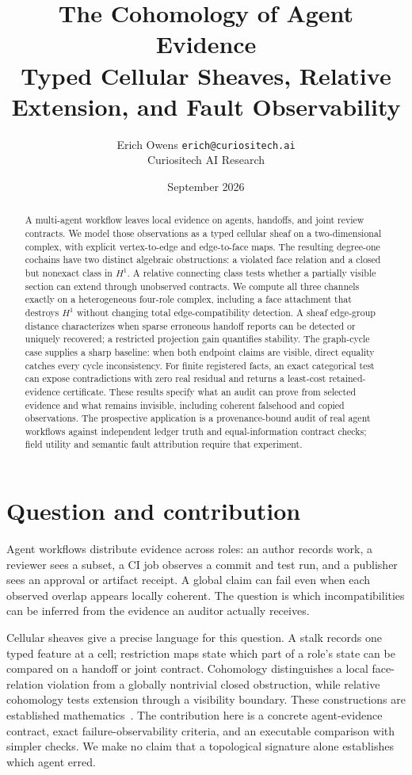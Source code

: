 \documentclass[11pt,a4paper]{article}
\title{\textbf{The Cohomology of Agent Evidence}\\[4pt]
\large Typed Cellular Sheaves, Relative Extension, and Fault Observability}
\author{Erich Owens \quad \texttt{erich@curiositech.ai}\\
\normalsize Curiositech AI Research}
\date{September 2026}
\begin{document}
\maketitle

\begin{abstract}
A multi-agent workflow leaves local evidence on agents, handoffs, and joint review contracts. We model those observations as a typed cellular sheaf on a two-dimensional complex, with explicit vertex-to-edge and edge-to-face maps. The resulting degree-one cochains have two distinct algebraic obstructions: a violated face relation and a closed but nonexact class in $H^1$. A relative connecting class tests whether a partially visible section can extend through unobserved contracts. We compute all three channels exactly on a heterogeneous four-role complex, including a face attachment that destroys $H^1$ without changing total edge-compatibility detection. A sheaf edge-group distance characterizes when sparse erroneous handoff reports can be detected or uniquely recovered; a restricted projection gain quantifies stability. The graph-cycle case supplies a sharp baseline: when both endpoint claims are visible, direct equality catches every cycle inconsistency. For finite registered facts, an exact categorical test can expose contradictions with zero real residual and returns a least-cost retained-evidence certificate. These results specify what an audit can prove from selected evidence and what remains invisible, including coherent falsehood and copied observations. The prospective application is a provenance-bound audit of real agent workflows against independent ledger truth and equal-information contract checks; field utility and semantic fault attribution require that experiment.
\end{abstract}

\section{Question and contribution}\label{sec:intro}
Agent workflows distribute evidence across roles: an author records work, a reviewer sees a subset, a CI job observes a commit and test run, and a publisher sees an approval or artifact receipt. A global claim can fail even when each observed overlap appears locally coherent. The question is which incompatibilities can be inferred from the evidence an auditor actually receives.

Cellular sheaves give a precise language for this question. A stalk records one typed feature at a cell; restriction maps state which part of a role's state can be compared on a handoff or joint contract. Cohomology distinguishes a local face-relation violation from a globally nontrivial closed obstruction, while relative cohomology tests extension through a visibility boundary. These constructions are established mathematics~\cite{hansen2019,curry2013,jiang2009}. The contribution here is a concrete agent-evidence contract, exact failure-observability criteria, and an executable comparison with simpler checks. We make no claim that a topological signature alone establishes which agent erred.
\end{document}
